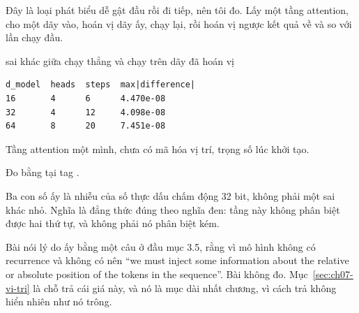 Đây là loại phát biểu dễ gật đầu rồi đi tiếp, nên tôi đo. Lấy một tầng
attention, cho một dãy vào, hoán vị dãy ấy, chạy lại, rồi hoán vị ngược kết quả
về và so với lần chạy đầu.

\begin{measured}{sai khác giữa chạy thẳng và chạy trên dãy đã hoán vị}
\begin{verbatim}
d_model  heads  steps  max|difference|
16       4      6      4.470e-08
32       4      12     4.098e-08
64       8      20     7.451e-08
\end{verbatim}

Tầng attention một mình, chưa có mã hóa vị trí, trọng số lúc khởi tạo.

Đo bằng  tại tag .
\end{measured}

Ba con số ấy là nhiễu của số thực dấu chấm động 32 bit, không phải một sai khác
nhỏ. Nghĩa là đẳng thức đúng theo nghĩa đen: tầng này không phân biệt được hai
thứ tự, và không phải nó phân biệt kém.

Bài nói lý do ấy bằng một câu ở đầu mục 3.5, rằng vì mô hình không có
recurrence và không có  nên \enquote{we must inject some information
about the relative or absolute position of the tokens in the sequence}. Bài
không đo. Mục~\ref{sec:ch07-vi-tri} là chỗ trả cái giá này, và nó là mục dài
nhất chương, vì cách trả không hiển nhiên như nó trông.
